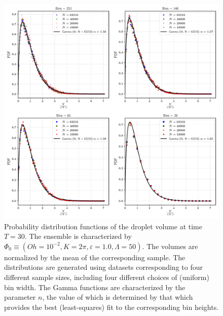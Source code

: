 \begin{figure}
\centering
\includegraphics{plots/drop_stats/long_time_volume_bins.pdf}
\caption{Probability distribution functions of the droplet volume at time $T = 30$. 
The ensemble is characterized by $\Phi_0 \equiv \left( Oh = 10^{-2}, K = 2\pi , \varepsilon = 1.0 , \Lambda = 50 \right)$. 
The volumes are normalized by the mean of the corresponding sample.  
The distributions are generated using datasets corresponding to four different sample sizes, 
including four different choices of (uniform) bin width. 
The Gamma functions are characterized by the parameter $n$, the value of which is determined 
by that which provides the best (least-squares) fit to the corresponding bin heights.  
	}
\label{t2_vol_bins}
\end{figure}




